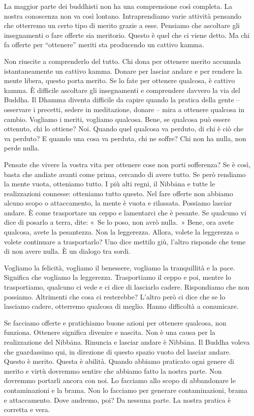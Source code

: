 La maggior parte dei buddhisti non ha una comprensione così completa. La
nostra conoscenza non va così lontano. Intraprendiamo varie attività
pensando che otterremo un certo tipo di merito grazie a esse. Pensiamo
che ascoltare gli insegnamenti o fare offerte sia meritorio. Questo è
quel che ci viene detto. Ma chi fa offerte per ``ottenere'' meriti sta
producendo un cattivo kamma.

Non riuscite a comprenderlo del tutto. Chi dona per ottenere merito
accumula istantaneamente un cattivo kamma. Donare per lasciar
andare e per rendere la mente libera, questo porta merito. Se lo fate
per ottenere qualcosa, è cattivo kamma. È difficile ascoltare gli
insegnamenti e comprendere davvero la via del Buddha. Il Dhamma diventa
difficile da capire quando la pratica della gente -- osservare i
precetti, sedere in meditazione, donare -- mira a ottenere qualcosa in
cambio. Vogliamo i meriti, vogliamo qualcosa. Bene, se qualcosa può
essere ottenuto, chi lo ottiene? Noi. Quando quel qualcosa va perduto,
di chi è ciò che va perduto? E quando una cosa va perduta, chi ne
soffre? Chi non ha nulla, non perde nulla.

Pensate che vivere la vostra vita per ottenere cose non porti
sofferenza? Se è così, basta che andiate avanti come prima, cercando di
avere tutto. Se però rendiamo la mente vuota, otteniamo tutto. I più
alti regni, il Nibbāna e tutte le realizzazioni connesse:
otteniamo tutto questo. Nel fare offerte non abbiamo alcuno scopo o
attaccamento, la mente è vuota e rilassata. Possiamo lasciar andare. È
come trasportare un ceppo e lamentarci che è pesante. Se qualcuno vi
dice di posarlo a terra, dite: «~Se lo poso, non avrò nulla.~» Bene, ora
avete qualcosa, avete la pesantezza. Non la leggerezza. Allora, volete
la leggerezza o volete continuare a trasportarlo? Uno dice mettilo giù,
l'altro risponde che teme di non avere nulla. È un dialogo tra sordi.

Vogliamo la felicità, vogliamo il benessere, vogliamo la tranquillità e
la pace. Significa che vogliamo la leggerezza. Trasportiamo il ceppo e
poi, mentre lo trasportiamo, qualcuno ci vede e ci dice di lasciarlo
cadere. Rispondiamo che non possiamo. Altrimenti che cosa ci resterebbe?
L'altro però ci dice che se lo lasciamo cadere, otterremo qualcosa di
meglio. Hanno difficoltà a comunicare.

Se facciamo offerte e pratichiamo buone azioni per ottenere qualcosa,
non funziona. Ottenere significa divenire e nascita. Non è una causa per
la realizzazione del Nibbāna. Rinuncia e lasciar andare è
Nibbāna. Il Buddha voleva che guardassimo qui, in direzione di
questo spazio vuoto del lasciar andare. Questo è merito. Questa è
abilità. Quando abbiamo praticato ogni genere di merito e virtù dovremmo
sentire che abbiamo fatto la nostra parte. Non dovremmo portarli ancora
con noi. Lo facciamo allo scopo di abbandonare le contaminazioni e la
brama. Non lo facciamo per generare contaminazioni, brama e
attaccamento. Dove andremo, poi? Da nessuna parte. La nostra pratica è
corretta e vera.

